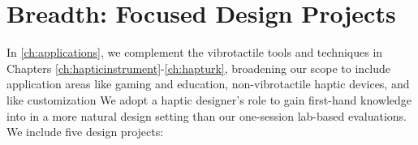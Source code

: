 
\chapter{Breadth: Focused Design Projects}
\label{ch:applications}

%

In \autoref{ch:applications}, we complement the vibrotactile tools and techniques in Chapters \ref{ch:hapticinstrument}-\ref{ch:hapturk}, broadening 
our scope to include application areas like gaming and education, non-vibrotactile haptic devices, and  like customization %
We adopt a haptic designer's role to gain first-hand knowledge into \haxd in a more natural design setting than our one-session lab-based evaluations.
We include five design projects:
